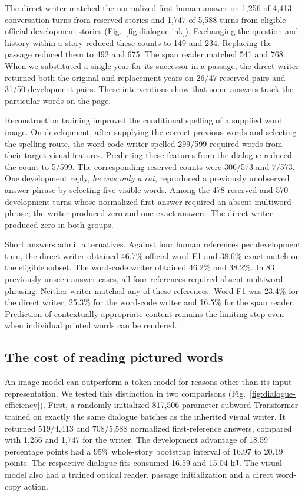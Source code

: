 \documentclass[12pt,a4paper]{article}
\providecommand{\DIFadd}[1]{{\protect\color{blue} \sf #1}} %
\begin{document}
\DIFadd{The direct writer matched the normalized first human answer on 1,256 of 4,413 conversation turns from reserved stories and 1,747 of 5,588 turns from eligible official development stories (Fig.~\ref{fig:dialogue-ink}). Exchanging the question and history within a story reduced these counts to 149 and 234. Replacing the passage reduced them to 492 and 675. The span reader matched 541 and 768. When we substituted a single year for its successor in a passage, the direct writer returned both the original and replacement years on 26/47 reserved pairs and 31/50 development pairs. These interventions show that some answers track the particular words on the page.
}

\DIFadd{Reconstruction training improved the conditional spelling of a supplied word image. On development, after supplying the correct previous words and selecting the spelling route, the word-code writer spelled 299/599 required words from their target visual features. Predicting these features from the dialogue reduced the count to 5/599. The corresponding reserved counts were 306/573 and 7/573. One development reply, \emph{he was only a cat}, reproduced a previously unobserved answer phrase by selecting five visible words. Among the 478 reserved and 570 development turns whose normalized first answer required an absent multiword phrase, the writer produced zero and one exact answers. The direct writer produced zero in both groups.
}

\DIFadd{Short answers admit alternatives. Against four human references per development turn, the direct writer obtained 46.7\% official word F1 and 38.6\% exact match on the eligible subset. The word-code writer obtained 46.2\% and 38.2\%. In 83 previously unseen-answer cases, all four references required absent multiword phrasing. Neither writer matched any of these references. Word F1 was 23.4\% for the direct writer, 25.3\% for the word-code writer and 16.5\% for the span reader. Prediction of contextually appropriate content remains the limiting step even when individual printed words can be rendered.
}

\subsection*{\DIFadd{The cost of reading pictured words}}
\DIFadd{An image model can outperform a token model for reasons other than its input representation. We tested this distinction in two comparisons (Fig.~\ref{fig:dialogue-efficiency}). First, a randomly initialized 817,506-parameter subword Transformer trained on exactly the same dialogue batches as the inherited visual writer. It returned 519/4,413 and 708/5,588 normalized first-reference answers, compared with 1,256 and 1,747 for the writer. The development advantage of 18.59 percentage points had a 95\% whole-story bootstrap interval of 16.97 to 20.19 points. The respective dialogue fits consumed 16.59 and 15.04 kJ. The visual model also had a trained optical reader, passage initialization and a direct word-copy action.
}
\end{document}
